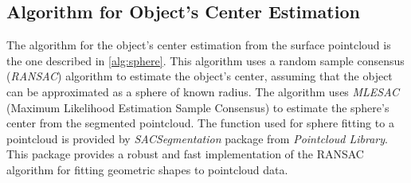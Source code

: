 \subsection{Algorithm for Object's Center Estimation}

The algorithm for the object's center estimation from the surface pointcloud is the one described
in \ref{alg:sphere}. This algorithm uses a random sample consensus (\textit{RANSAC}) algorithm to estimate 
the object's center, assuming that the object can be approximated as a sphere of known radius.
The algorithm uses \textit{MLESAC} (Maximum Likelihood Estimation Sample Consensus) to estimate the sphere's center
from the segmented pointcloud. The function used for sphere fitting to a pointcloud is provided by
\textit{SACSegmentation} package from \textit{Pointcloud Library}. This package provides a robust and fast
implementation of the RANSAC algorithm for fitting geometric shapes to pointcloud data. 

